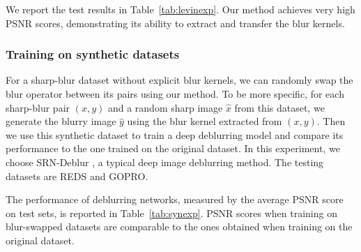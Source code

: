 \documentclass[final]{cvpr}
\newcommand{\Tref}[1]{Table~\ref{#1}}
\begin{document}
We report the test results in  \Tref{tab:levinexp}. Our method achieves very high PSNR scores, demonstrating its ability to extract and transfer the blur kernels. 

\subsubsection{Training on synthetic datasets}
For a sharp-blur dataset without explicit blur kernels, we can randomly swap the blur operator between its pairs using our method. To be more specific, for each sharp-blur pair $(x, y)$ and a random sharp image $\hat{x}$ from this dataset, we generate the blurry image $\hat{y}$ using the blur kernel extracted from $(x, y)$. Then we use this synthetic dataset to train a deep deblurring model and compare its performance to the one trained on the original dataset. In this experiment, we choose SRN-Deblur \cite{tao2018scale}, a typical deep image deblurring method. The testing datasets are REDS and GOPRO. %

The performance of deblurring networks, measured by the average PSNR score on test sets, is reported in \Tref{tab:synexp}. PSNR scores when training on blur-swapped datasets are comparable to the ones obtained when training on the original dataset.

\end{document}
